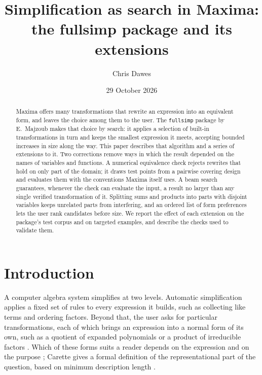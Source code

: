 \documentclass[11pt]{amsart}
\theoremstyle{definition}
\theoremstyle{remark}
\begin{document}
\title[Simplification as search in Maxima]{Simplification as search in Maxima:\\
the fullsimp package and its extensions}

\author{Chris Dawes}

\date{29 October 2026}


\begin{abstract}
Maxima offers many transformations that rewrite an expression into an
equivalent form, and leaves the choice among them to the user. The
\texttt{fullsimp} package by E.~Majzoub makes that choice by search: it
applies a selection of built-in transformations in turn and keeps the
smallest expression it meets, accepting bounded increases in size along the
way. This paper describes that algorithm and a series of extensions to it.
Two corrections remove ways in which the result depended on the names of
variables and functions. A numerical equivalence check rejects rewrites that hold on only
part of the domain; it draws test points from a pairwise covering design and
evaluates them with the conventions Maxima itself uses. A beam search
guarantees, whenever the check can evaluate the input, a result no larger
than any single verified transformation of it. Splitting sums and products
into parts with disjoint variables keeps unrelated parts from interfering, and an ordered list of form preferences
lets the user rank candidates before size. We report the effect of each
extension on the package's test corpus and on targeted examples, and describe
the checks used to validate them.
\end{abstract}

\maketitle

\section{Introduction}

A computer algebra system simplifies at two levels. Automatic simplification
applies a fixed set of rules to every expression it builds, such as
collecting like terms and ordering factors. Beyond that, the user asks for
particular transformations, each of which brings an expression into a
normal form of its own, such as a quotient of expanded polynomials or a
product of irreducible factors \cite{Moses71,BuchbergerLoos82}. Which of
these forms suits a reader depends on the expression and on the purpose
\cite{Moses71}; Carette gives a formal definition of the representational
part of the question, based on minimum description length
\cite{Carette04}.
\end{document}
